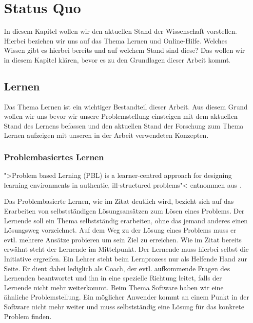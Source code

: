 
\chapter{Status Quo}
In diesem Kapitel wollen wir den aktuellen Stand der Wissenschaft vorstellen. Hierbei beziehen wir uns auf das Thema Lernen und Online-Hilfe. Welches Wissen gibt es hierbei bereits und auf welchem Stand sind diese? Das wollen wir in diesem Kapitel klären, bevor es zu den Grundlagen dieser Arbeit kommt.

\section{Lernen}
Das Thema Lernen ist ein wichtiger Bestandteil dieser Arbeit. Aus diesem Grund wollen wir uns bevor wir unsere Problemstellung einsteigen mit dem aktuellen Stand des Lernens befassen und den aktuellen Stand der Forschung zum Thema Lernen aufzeigen mit unseren in der Arbeit verwendeten Konzepten.


\subsection{Problembasiertes Lernen}
">Problem based Lerning (PBL) is a learner-centred approach for designing learning environments in authentic, ill-structured problems"< entnommen aus \cite{zumbachproblembasiertes}. \par

Das Problembasierte Lernen, wie im Zitat deutlich wird, bezieht sich auf das Erarbeiten von selbstständigen Lösungsansätzen zum Lösen eines Problems. Der Lernende soll ein Thema selbstständig erarbeiten, ohne das jemand anderes einen Lösungsweg vorzeichnet. Auf dem Weg zu der Lösung eines Problems muss er evtl. mehrere Ansätze probieren um sein Ziel zu erreichen. Wie im Zitat bereits erwähnt steht der Lernende im Mittelpunkt. Der Lernende muss hierbei selbst die Initiative ergreifen. Ein Lehrer steht beim Lernprozess nur als Helfende Hand zur Seite. Er dient dabei lediglich als Coach, der evtl. aufkommende Fragen des Lernenden beantwortet und ihn in eine spezielle Richtung leitet, falls der Lernende nicht mehr weiterkommt. Beim Thema Software haben wir eine ähnliche Problemstellung. Ein möglicher Anwender kommt an einem Punkt in der Software nicht mehr weiter und muss selbstständig eine Lösung für das konkrete Problem finden. 
 
